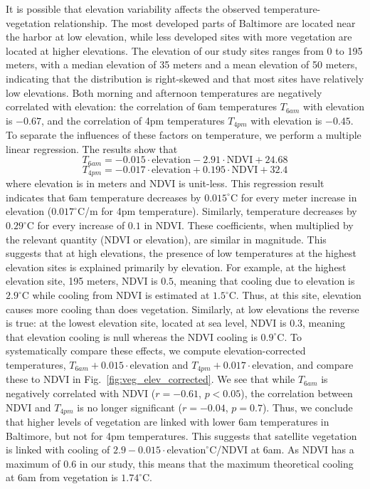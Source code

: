 It is possible that elevation variability affects the observed  temperature-vegetation relationship. The most developed parts of Baltimore are located near the harbor at low elevation, while less developed sites with more vegetation are located at higher elevations. The elevation of our study sites ranges from 0 to 195 meters, with a median elevation of 35 meters and a mean elevation of 50 meters, indicating that the distribution is right-skewed and that most sites have relatively low elevations. Both morning and afternoon temperatures are negatively correlated with elevation: the correlation of 6am temperatures $T_{6am}$ with elevation is $-0.67$, and the correlation of 4pm temperatures $T_{4pm}$ with elevation is $-0.45$. To separate the influences of these factors on temperature, we perform a multiple linear regression. The results show that 
\[ T_{6am} = -0.015\cdot \text{elevation} -2.91 \cdot \text{NDVI} + 24.68\] 
\[ T_{4pm} = -0.017\cdot \text{elevation} +0.195 \cdot \text{NDVI} + 32.4\]
where elevation is in meters and NDVI is unit-less. 
This regression result indicates that 6am temperature decreases by $0.015^\circ$C for every meter increase in elevation ($0.017^\circ$C/m for 4pm temperature). Similarly, temperature decreases by $0.29^\circ$C for every increase of $0.1$ in NDVI. 
These coefficients, when multiplied by the relevant quantity (NDVI or elevation), are similar in magnitude. 
This suggests that at high elevations, the presence of low temperatures at the highest elevation sites is explained primarily by elevation.
 For example, at the highest elevation site, 195 meters, NDVI is $0.5$, meaning that cooling due to elevation is $2.9^\circ$C while cooling from NDVI is estimated at $1.5^\circ$C. Thus, at this site, elevation causes more cooling than does vegetation. 
 Similarly, at low elevations the reverse is true: at the lowest elevation site, located at sea level, NDVI is $0.3$, meaning that elevation cooling is null whereas the NDVI cooling is  $0.9^\circ$C. 
To systematically compare these effects, 
we compute elevation-corrected temperatures, $T_{6am} + 0.015\cdot \text{elevation}$ and $T_{4pm} + 0.017\cdot \text{elevation}$, and compare these to NDVI in Fig.~\ref{fig:veg_elev_corrected}. We see that while $T_{6am}$ is negatively correlated with NDVI ($r=-0.61$, $p<0.05$), the correlation between NDVI and $T_{4pm}$ is no longer significant ($r=-0.04$, $p=0.7$). 
Thus, we conclude that higher levels of vegetation are linked with lower 6am temperatures in Baltimore, but not for 4pm temperatures. This suggests that satellite vegetation is linked with cooling of $2.9 - 0.015\cdot \text{elevation} ^\circ$C/$\text{NDVI}$ at 6am. As NDVI has a maximum of $0.6$ in our study, this means that the maximum theoretical cooling at 6am from vegetation is $1.74^\circ$C. 

